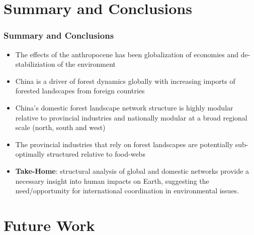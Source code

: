 \documentclass[aspectratio=169]{beamer}
\begin{document}
\section{Summary and Conclusions}


\begin{frame}
  \frametitle{Summary and Conclusions}
  \begin{itemize}
     \item The effects of the anthropocene has been globalization of
     economies and de-stabiliziation of the environment \pause
     \item China is a driver of forest dynamics globally with
  increasing imports of forested landscapes from foreign countries \pause
     \item China's domestic forest landscape network structure is
  highly modular relative to provincial industries and nationally
  modular at a broad regional scale (north, south and west) \pause
     \item The provincial industries that rely on forest landscapes
  are potentially sub-optimally structured relative to food-webs \pause
  \item \textbf{Take-Home}: structural analysis of global and domestic
  networks provide a necessary insight into human impacts on Earth,
  suggesting the need/opportunity for international coordination in
  environmental issues.
\end{itemize}
\end{frame}


\section{Future Work}
\end{document}
